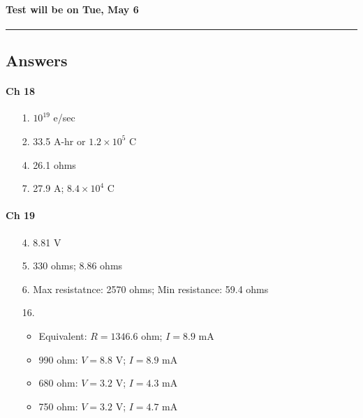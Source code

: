 \documentclass[10pt]{exam}
\begin{document}

\paragraph{Test will be on Tue, May 6} \hfill

\vspace{1em}
\hrule





\pagebreak

\subsection*{Answers}

\begin{multicols}{2}

  \paragraph{Ch 18}

  \begin{itemize}[noitemsep]
    \item[1.] $10^{19}$ e/sec
    \item[2.] 33.5 A-hr or $1.2 \times 10^5$ C
    \item[4.] 26.1 ohms
    \item[7.] 27.9 A;  $8.4 \times 10^4$ C
    
  \end{itemize}

  \paragraph{Ch 19}

  \begin{itemize}[noitemsep]
    \item[4.] 8.81 V
    \item[5.]330 ohms; 8.86 ohms
    \item[6.] Max resistatnce: 2570 ohms; Min resistance: 59.4 ohms
    \item[16.] \hfill
      \begin{itemize}[noitemsep]
        \item Equivalent:  $R = 1346.6$ ohm; $I = 8.9$ mA 
        \item 990 ohm: $V = 8.8$ V;  $I = 8.9$ mA
        \item 680 ohm: $V = 3.2$ V;  $I = 4.3$ mA
        \item 750 ohm: $V = 3.2$ V;  $I = 4.7$ mA
      \end{itemize}


    
  \end{itemize}

\end{multicols}
\end{document}
